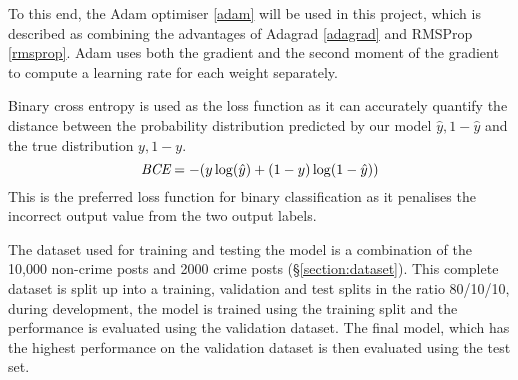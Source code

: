 \documentclass[12pt,a4paper,twoside,openright]{report}
\begin{document}
To this end, the Adam optimiser \ref{adam} will be used in this project, which is described as combining the advantages of Adagrad \ref{adagrad} and RMSProp \ref{rmsprop}. Adam uses both the gradient and the second moment of the gradient to compute a learning rate for each weight separately.
\newline

Binary cross entropy is used as the loss function as it can accurately quantify the distance between the probability distribution predicted by our model ${\hat{y}, 1-\hat{y}}$ and the true distribution ${y, 1-y}$.
\begin{equation}
    \textit{\text{BCE}} =  -(y\log(\hat{y}) + (1-y)\log(1-\hat{y}))
\end{equation}
This is the preferred loss function for binary classification as it penalises the incorrect output value from the two output labels.
\newline 

The dataset used for training and testing the model is a combination of the 10,000 non-crime posts and 2000 crime posts (\S\ref{section:dataset}). This complete dataset is split up into a training, validation and test splits in the ratio 80/10/10, during development, the model is trained using the training split and the performance is evaluated using the validation dataset. The final model, which has the highest performance on the validation dataset is then evaluated using the test set.



 
\end{document}
